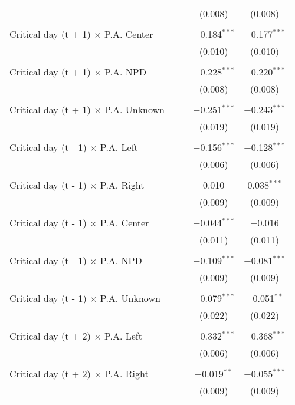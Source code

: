 \documentclass[
]{article}
\begin{document}
\begin{table}[!htbp]
{\begin{tabular}{@{\extracolsep{5pt}}lcccc}
  &  &  & (0.008) & (0.008) \\ 
  & & & & \\ 
 Critical day (t + 1) $\times$ P.A. Center &  &  & $-$0.184$^{***}$ & $-$0.177$^{***}$ \\ 
  &  &  & (0.010) & (0.010) \\ 
  & & & & \\ 
 Critical day (t + 1) $\times$ P.A. NPD &  &  & $-$0.228$^{***}$ & $-$0.220$^{***}$ \\ 
  &  &  & (0.008) & (0.008) \\ 
  & & & & \\ 
 Critical day (t + 1) $\times$ P.A. Unknown &  &  & $-$0.251$^{***}$ & $-$0.243$^{***}$ \\ 
  &  &  & (0.019) & (0.019) \\ 
  & & & & \\ 
 Critical day (t - 1) $\times$ P.A. Left &  &  & $-$0.156$^{***}$ & $-$0.128$^{***}$ \\ 
  &  &  & (0.006) & (0.006) \\ 
  & & & & \\ 
 Critical day (t - 1) $\times$ P.A. Right &  &  & 0.010 & 0.038$^{***}$ \\ 
  &  &  & (0.009) & (0.009) \\ 
  & & & & \\ 
 Critical day (t - 1) $\times$ P.A. Center &  &  & $-$0.044$^{***}$ & $-$0.016 \\ 
  &  &  & (0.011) & (0.011) \\ 
  & & & & \\ 
 Critical day (t - 1) $\times$ P.A. NPD &  &  & $-$0.109$^{***}$ & $-$0.081$^{***}$ \\ 
  &  &  & (0.009) & (0.009) \\ 
  & & & & \\ 
 Critical day (t - 1) $\times$ P.A. Unknown &  &  & $-$0.079$^{***}$ & $-$0.051$^{**}$ \\ 
  &  &  & (0.022) & (0.022) \\ 
  & & & & \\ 
 Critical day (t + 2) $\times$ P.A. Left &  &  & $-$0.332$^{***}$ & $-$0.368$^{***}$ \\ 
  &  &  & (0.006) & (0.006) \\ 
  & & & & \\ 
 Critical day (t + 2) $\times$ P.A. Right &  &  & $-$0.019$^{**}$ & $-$0.055$^{***}$ \\ 
  &  &  & (0.009) & (0.009) \\ 

\end{tabular}}
\end{table}
\end{document}
